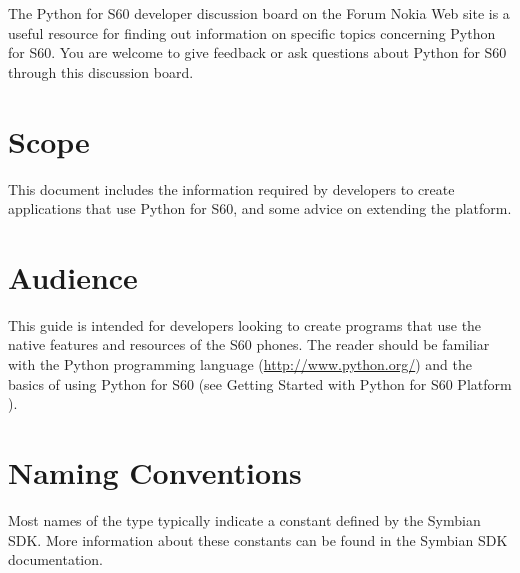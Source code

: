 The Python for S60 developer discussion board \cite{PyS60DiBo} on the 
Forum Nokia Web site is a useful resource for finding out information on 
specific topics concerning Python for S60. You are welcome to give 
feedback or ask questions about Python for S60 through this discussion 
board.

\section{Scope}
\label{subsec:scope}

This document includes the information required by developers to create 
applications that use Python for S60, and some advice on extending the 
platform.

\section{Audience}
\label{subsec:audience}

This guide is intended for developers looking to create programs that use the 
native features and resources of the S60 phones. The reader should be 
familiar with the Python programming language (\url{http://www.python.org/}) and 
the basics of using Python for S60 (see Getting Started with Python for 
S60 Platform \cite{PyS60Start}).


\section{Naming Conventions}
\label{subsec:naming}

Most names of the type  typically indicate a constant defined 
by the Symbian SDK. More information about these constants can be found in the 
Symbian SDK documentation.
